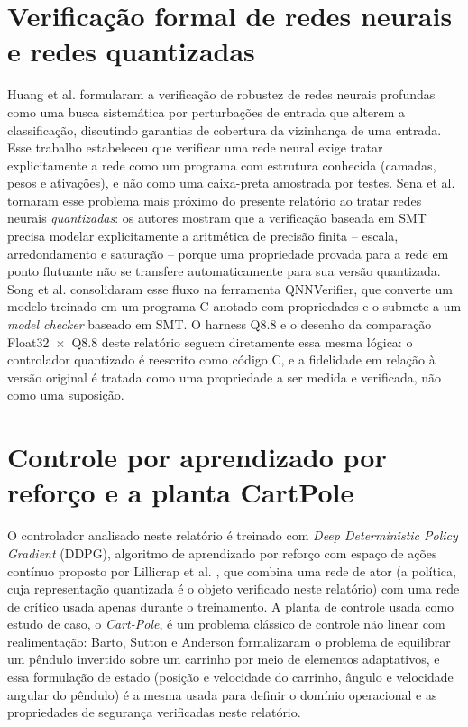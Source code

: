 \section{Verificação formal de redes neurais e redes quantizadas}
Huang et al. \cite{huang2017robustness} formularam a verificação de
robustez de redes neurais profundas como uma busca sistemática por
perturbações de entrada que alterem a classificação, discutindo garantias
de cobertura da vizinhança de uma entrada. Esse trabalho estabeleceu que
verificar uma rede neural exige tratar explicitamente a rede como um
programa com estrutura conhecida (camadas, pesos e ativações), e não como
uma caixa-preta amostrada por testes. Sena et al.
\cite{sena2021verifying} tornaram esse problema mais próximo do
presente relatório ao tratar redes neurais \emph{quantizadas}: os autores
mostram que a verificação baseada em SMT precisa modelar explicitamente a
aritmética de precisão finita -- escala, arredondamento e saturação --
porque uma propriedade provada para a rede em ponto flutuante não se
transfere automaticamente para sua versão quantizada. Song et al.
\cite{song2022qnnverifier} consolidaram esse fluxo na ferramenta
QNNVerifier, que converte um modelo treinado em um programa C anotado com
propriedades e o submete a um \textit{model checker} baseado em SMT. O
harness Q8.8 e o desenho da comparação Float32~$\times$~Q8.8 deste
relatório seguem diretamente essa mesma lógica: o controlador quantizado é
reescrito como código C, e a fidelidade em relação à versão original é
tratada como uma propriedade a ser medida e verificada, não como uma
suposição.

\section{Controle por aprendizado por reforço e a planta CartPole}
O controlador analisado neste relatório é treinado com \textit{Deep
Deterministic Policy Gradient} (DDPG), algoritmo de aprendizado por reforço
com espaço de ações contínuo proposto por Lillicrap et al.
\cite{lillicrap2016ddpg}, que combina uma rede de ator (a política, cuja
representação quantizada é o objeto verificado neste relatório) com uma
rede de crítico usada apenas durante o treinamento. A planta de controle
usada como estudo de caso, o \textit{Cart-Pole}, é um problema clássico de
controle não linear com realimentação: Barto, Sutton e Anderson
\cite{barto1983cartpole} formalizaram o problema de equilibrar um pêndulo
invertido sobre um carrinho por meio de elementos adaptativos, e essa
formulação de estado (posição e velocidade do carrinho, ângulo e
velocidade angular do pêndulo) é a mesma usada para definir o domínio
operacional e as propriedades de segurança verificadas neste relatório.


